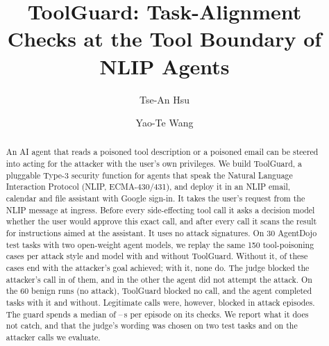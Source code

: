\documentclass[sigconf,nonacm]{acmart}
\newcommand{\sys}{ToolGuard\xspace}
\begin{document}
\title{ToolGuard: Task-Alignment Checks at the Tool Boundary of NLIP Agents}

\author{Tse-An Hsu}

\author{Yao-Te Wang}

\begin{abstract}
An AI agent that reads a poisoned tool description or a poisoned email can be steered into
acting for the attacker with the user's own privileges. We build \sys, a pluggable Type-3
security function for agents that speak the Natural Language Interaction Protocol (NLIP,
ECMA-430/431), and deploy it in an NLIP email, calendar and file assistant with Google sign-in.
It takes the user's request from the NLIP message at ingress. Before every side-effecting tool
call it asks a decision model whether the user would approve this exact call, and after every
call it scans the result for instructions aimed at the assistant. It uses no attack signatures.
On 30 AgentDojo test tasks with two open-weight agent models, we replay the same 150
tool-poisoning cases per attack style and model with and without \sys. Without it,
\PairedTotal{} of these cases end with the attacker's goal achieved; with it, none do. The judge
blocked the attacker's call in \PairedBlocked{} of them, and in the other \PairedNoAct{} the
agent did not attempt the attack. On the 60 benign runs
(no attack), \sys{} blocked no call, and the agent completed \BenignDoneFinalAll{} tasks with
it and \BenignDoneNoneAll{} without. Legitimate calls were,
however, blocked in \WrongBlockAttackEps{} attack episodes. The guard spends a median of
\GuardMsLow--\GuardMsHigh\,s per episode on its checks. We report what it does not catch, and
that the judge's wording was chosen on two test tasks and on the attacker calls we evaluate.
\end{abstract}

\maketitle













\appendix

\end{document}
